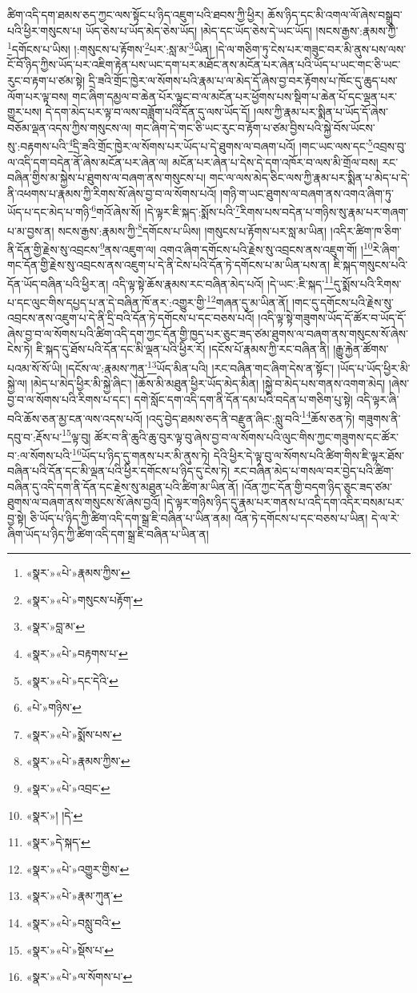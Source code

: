 ཚིག་འདི་དག་ཐམས་ཅད་ཀྱང་ལས་སྟོང་པ་ཉིད་འཇུག་པའི་ཐབས་ཀྱི་ཕྱིར། ཆོས་ཉིད་དང་མི་འགལ་ལོ་ཞེས་བསྒྲུབ་པའི་ཕྱིར་གསུངས་པ། ཡོད་ཅེས་པ་ཡོད་མེད་ཅེས་ཡོད། །མེད་དང་ཡོད་ཅེས་དེ་ཡང་ཡོད། །སངས་རྒྱས་:རྣམས་ཀྱི་\footnote{«སྣར་»«པེ་»རྣམས་ཀྱིས་}དགོངས་པ་ཡིས། །:གསུངས་པ་རྟོགས་\footnote{«སྣར་»«པེ་»གསུངས་པརྟོག་}པར་:སླ་མ་\footnote{«སྣར་»བླ་མ་}ཡིན། །དེ་ལ་གཅིག་ཏུ་ངེས་པར་གཟུང་བར་མི་ནུས་པས་ལས་ངོ་བོ་ཉིད་ཀྱིས་ཡོད་པར་འཇིག་རྟེན་པས་ཡང་དག་པར་མཐོང་ནས་མངོན་པར་ཞེན་པའི་ཡོད་པ་ཡང་གང་ཅི་ཡང་རུང་བ་རྟག་པ་ཙམ་སྟེ། དྲི་ཟའི་གྲོང་ཁྱེར་ལ་སོགས་པའི་རྣམ་པ་ལ་མེད་དོ་ཞེས་བྱ་བར་རྟོགས་པ་ཁོང་དུ་ཆུད་པས་ལོག་པར་ལྟ་བས། གང་ཞིག་དམྱལ་བ་ཆེན་པོར་ལྟུང་བ་ལ་མངོན་པར་ཕྱོགས་པས་སྡིག་པ་ཆེན་པོ་དང་ལྡན་པར་གྱུར་པས། དེ་དག་མེད་པར་ལྟ་བ་ལས་བཟློག་པའི་དོན་དུ་ལས་ཡོད་དོ། །ལས་ཀྱི་རྣམ་པར་སྨིན་པ་ཡོད་དོ་ཞེས་བཅོམ་ལྡན་འདས་ཀྱིས་གསུངས་ལ། གང་ཞིག་དེ་གང་ཅི་ཡང་རུང་བ་རྟོག་པ་ཙམ་བྱིས་པའི་སྐྱེ་བོས་ཡོངས་སུ་:བརྟགས་པའི་\footnote{«སྣར་»«པེ་»བརྟགས་པ་}དྲི་ཟའི་གྲོང་ཁྱེར་ལ་སོགས་པར་ཡོད་པ་དེ་ཐུགས་ལ་བཞག་པའོ། །གང་ཡང་ལས་དང་\footnote{«སྣར་»«པེ་»དང་དེའི་}འབྲས་བུ་ལ་འདི་དག་བདེན་ནོ་ཞེས་མངོན་པར་ཞེན་ལ། མངོན་པར་ཞེན་པ་དེས་དེ་དག་འཁོར་བ་ལས་མི་གྲོལ་བས། རང་བཞིན་གྱིས་མ་སྐྱེས་པ་ཐུགས་ལ་བཞག་ནས་གསུངས་པ། གང་ལ་ལས་མེད་ཅིང་ལས་ཀྱི་རྣམ་པར་སྨིན་པ་མེད་པ་དེ་ནི་འཕགས་པ་རྣམས་ཀྱི་རིགས་སོ་ཞེས་བྱ་བ་ལ་སོགས་པའོ། །གཉི་ག་ཡང་ཐུགས་ལ་བཞག་ནས་འགའ་ཞིག་ཏུ་ཡོད་པ་དང་མེད་པ་གཉི་\footnote{«པེ་»གཉིས་}གའོ་ཞེས་སོ། །དེ་ལྟར་ཇི་སྐད་:སྨོས་པའི་\footnote{«སྣར་»«པེ་»སྨོས་པས་}རིགས་པས་བདེན་པ་གཉིས་སུ་རྣམ་པར་གཞག་པ་མ་བྱས་ན། སངས་རྒྱས་:རྣམས་ཀྱི་\footnote{«སྣར་»«པེ་»རྣམས་ཀྱིས་}དགོངས་པ་ཡིས། །གསུངས་པ་རྟོགས་པར་སླ་མ་ཡིན། །འདིར་ཚིག་ཁ་ཅིག་ནི་དོན་གྱི་རྗེས་སུ་འབྲངས་\footnote{«སྣར་»«པེ་»འབྲང་}ནས་འཇུག་ལ། འགའ་ཞིག་དགོངས་པའི་རྗེས་སུ་འབྲངས་ནས་འཇུག་གོ། །\footnote{«སྣར་»། །དེ་}རེ་ཞིག་གང་དོན་གྱི་རྗེས་སུ་འབྲངས་ནས་འཇུག་པ་དེ་ནི་ངེས་པའི་དོན་ཏེ་དགོངས་པ་མ་ཡིན་པས་ན། ཇི་སྐད་གསུངས་པའི་དོན་ཡོད་བཞིན་པའི་ཕྱིར་ན། འདི་ལྟ་སྟེ་ཆོས་རྣམས་རང་བཞིན་མེད་པའོ། །དེ་ཡང་:ཇི་སྐད་\footnote{«སྣར་»དེ་སྐད་}དུ་སྨོས་པའི་རིགས་པ་དང་ལུང་གིས་དཔྱད་པ་ན་དེ་བཞིན་ཁོ་ནར་:འགྱུར་གྱི་\footnote{«སྣར་»«པེ་»འགྱུར་གྱིས་}གཞན་དུ་མ་ཡིན་ནོ། །གང་དུ་དགོངས་པའི་རྗེས་སུ་འབྲངས་ནས་འཇུག་པ་དེ་ནི་དྲི་བའི་དོན་ཏེ་དགོངས་པ་དང་བཅས་པའོ། །འདི་ལྟ་སྟེ་གཟུགས་ཡོད་དོ་ཚོར་བ་ཡོད་དོ་ཞེས་བྱ་བ་ལ་སོགས་པའི་ཚིག་འདི་དག་ཀྱང་དོན་གྱི་ཁྱད་པར་ཅུང་ཟད་ཙམ་ཐུགས་ལ་བཞག་ནས་གསུངས་སོ་ཞེས་ངེས་ཏེ། ཇི་སྐད་དུ་ཐོས་པའི་དོན་དང་མི་ལྡན་པའི་ཕྱིར་རོ། །དངོས་པོ་རྣམས་ཀྱི་རང་བཞིན་ནི། །རྒྱུ་རྐྱེན་ཚོགས་པའམ་སོ་སོ་ཡི། །དངོས་ལ་:རྣམས་ཀུན་\footnote{«སྣར་»«པེ་»རྣམ་ཀུན་}ཡོད་མིན་པའི། །རང་བཞིན་གང་ཞིག་དེས་ན་སྟོང་། །ཡོད་པ་ཡོད་ཕྱིར་མི་སྐྱེ་ལ། །མེད་པ་མེད་ཕྱིར་མི་སྐྱེ་ཞིང་། །ཆོས་མི་མཐུན་ཕྱིར་ཡོད་མེད་མིན། །སྐྱེ་བ་མེད་པས་གནས་འགག་མེད། །ཞེས་བྱ་བ་ལ་སོགས་པའི་རིགས་པ་དང་། དགེ་སློང་དག་འདི་དག་ནི་དོན་དམ་པའི་བདེན་པ་གཅིག་པུ་སྟེ། འདི་ལྟར་ཞི་བའི་ཆོས་ཅན་མྱ་ངན་ལས་འདས་པའོ། །འདུ་བྱེད་ཐམས་ཅད་ནི་བརྫུན་ཞིང་:སླུ་བའི་\footnote{«སྣར་»«པེ་»བསླུ་བའི་}ཆོས་ཅན་ཏེ། གཟུགས་ནི་དབུ་བ་:རྡོས་པ་\footnote{«སྣར་»«པེ་»སྡོས་པ་}ལྟ་བུ། ཚོར་བ་ནི་ཆུའི་ཆུ་བུར་ལྟ་བུ་ཞེས་བྱ་བ་ལ་སོགས་པའི་ལུང་གིས་ཀྱང་གཟུགས་དང་ཚོར་བ་:ལ་སོགས་པའི་\footnote{«སྣར་»«པེ་»ལ་སོགས་པ་}ཡོད་པ་ཉིད་དུ་གནས་པར་མི་ནུས་ཏེ། དེའི་ཕྱིར་དེ་ལྟ་བུ་ལ་སོགས་པའི་ཚིག་གིས་ཇི་ལྟར་ཐོས་བཞིན་པའི་དོན་དང་མི་ལྡན་པའི་ཕྱིར་དགོངས་པ་ཉིད་དུ་ངེས་ཏེ། རང་བཞིན་མེད་པ་གསལ་བར་བྱེད་པའི་ཚིག་བཞིན་དུ་འདི་དག་ནི་དོན་དང་རྗེས་སུ་མཐུན་པའི་ཚིག་མ་ཡིན་ནོ། །འོན་ཀྱང་དོན་གྱི་བདག་ཉིད་ཅུང་ཟད་ཙམ་ཐུགས་ལ་བཞག་ནས་གསུངས་སོ་ཞེས་བྱའོ། །དེ་ལྟར་གཉིས་ཉིད་དུ་རྣམ་པར་གནས་པ་འདི་དག་འདིར་བསམ་པར་བྱ་སྟེ། ཅི་ཡོད་པ་ཉིད་ཀྱི་ཚིག་འདི་དག་སྒྲ་ཇི་བཞིན་པ་ཡིན་ནམ། འོན་ཏེ་དགོངས་པ་དང་བཅས་པ་ཡིན། དེ་ལ་རེ་ཞིག་ཡོད་པ་ཉིད་ཀྱི་ཚིག་འདི་དག་སྒྲ་ཇི་བཞིན་པ་ཡིན་ན། 